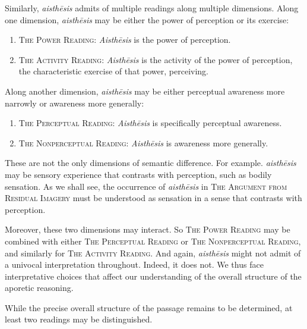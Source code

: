 Similarly, \emph{aisthēsis} admits of multiple readings along multiple dimensions. Along one dimension, \emph{aisthēsis} may be either the power of perception or its exercise:
\begin{enumerate}[(1)]
	\item \textsc{The Power Reading}: \emph{Aisthēsis} is the power of perception.
	\item \textsc{The Activity Reading}: \emph{Aisthēsis} is the activity of the power of perception, the characteristic exercise of that power, perceiving.
\end{enumerate}
Along another dimension, \emph{aisthēsis} may be either perceptual awareness more narrowly or awareness more generally:
\begin{enumerate}[(1)]
	\item \textsc{The Perceptual Reading}: \emph{Aisthēsis} is specifically perceptual awareness.
	\item \textsc{The Nonperceptual Reading}: \emph{Aisthēsis} is awareness more generally.
\end{enumerate}
These are not the only dimensions of semantic difference. For example. \emph{aisthēsis} may be sensory experience that contrasts with perception, such as bodily sensation. As we shall see, the occurrence of \emph{aisthēsis} in \textsc{The Argument from Residual Imagery} must be understood as sensation in a sense that contrasts with perception.

Moreover, these two dimensions may interact. So \textsc{The Power Reading} may be combined with either \textsc{The Perceptual Reading} or \textsc{The Nonperceptual Reading}, and similarly for \textsc{The Activity Reading}. And again, \emph{aisthēsis} might not admit of a univocal interpretation throughout. Indeed, it does not. We thus face interpretative choices that affect our understanding of the overall structure of the aporetic reasoning. 

While the precise overall structure of the passage remains to be determined, at least two readings may be distinguished.

